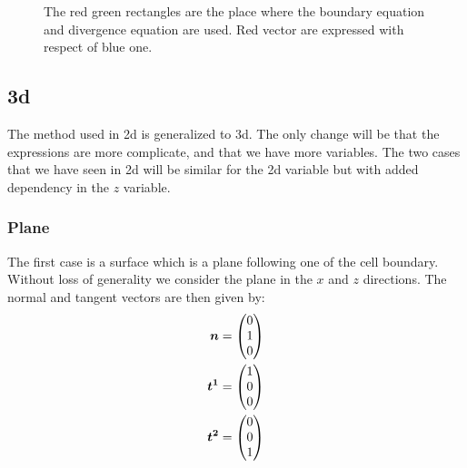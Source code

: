 \begin{figure}
\caption{The red green rectangles are the place where the boundary equation and divergence equation are used.
Red vector are expressed with respect of blue one.}
\label{topology:extrap:plane_45}
\end{figure}

\subsection{3d}
The method used in 2d is generalized to 3d. The only change will be that the expressions are more complicate, and that we have more variables.
The two cases that we have seen in 2d will be similar for the 2d variable but with added dependency in the $z$ variable.

\subsubsection{Plane}

The first case is a surface which is a plane following one of the cell boundary.
Without loss of generality we consider the plane in the $x$ and $z$ directions.
The normal and tangent vectors are then given by:
\begin{align}
	{\boldsymbol {n}}&=\begin{pmatrix}
			0\\
			1\\
			0
		\end{pmatrix}\\
	{\boldsymbol {t^1}}&=\begin{pmatrix}
			1\\
			0\\
			0
		\end{pmatrix}\\
		{\boldsymbol {t^2}}&=\begin{pmatrix}
			0\\
			0\\
			1
		\end{pmatrix}
\end{align}

